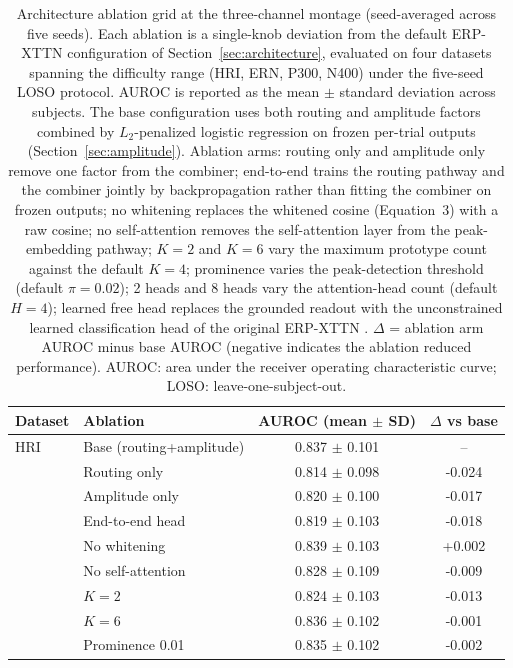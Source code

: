 \begin{table}[t]
\centering
\setlength{\tabcolsep}{6pt}
\caption{%
Architecture ablation grid at the three-channel montage (seed-averaged across five seeds). Each ablation is a single-knob deviation from the default ERP-XTTN configuration of Section~\ref{sec:architecture}, evaluated on four datasets spanning the difficulty range (HRI, ERN, P300, N400) under the five-seed LOSO protocol. AUROC is reported as the mean $\pm$ standard deviation across subjects. The base configuration uses both routing and amplitude factors combined by $L_2$-penalized logistic regression on frozen per-trial outputs (Section~\ref{sec:amplitude}). Ablation arms: routing only and amplitude only remove one factor from the combiner; end-to-end trains the routing pathway and the combiner jointly by backpropagation rather than fitting the combiner on frozen outputs; no whitening replaces the whitened cosine (Equation~3) with a raw cosine; no self-attention removes the self-attention layer from the peak-embedding pathway; $K = 2$ and $K = 6$ vary the maximum prototype count against the default $K = 4$; prominence varies the peak-detection threshold (default $\pi = 0.02$); 2 heads and 8 heads vary the attention-head count (default $H = 4$); learned free head replaces the grounded readout with the unconstrained learned classification head of the original ERP-XTTN \cite{wyman2026}. $\Delta$ = ablation arm AUROC minus base AUROC (negative indicates the ablation reduced performance). AUROC: area under the receiver operating characteristic curve; LOSO: leave-one-subject-out.%
}
\label{sup:tab-ablation}
\begin{tabular}{llcc}
\toprule
Dataset & Ablation & AUROC (mean $\pm$ SD) & $\Delta$ vs base \\
\midrule
HRI & Base (routing+amplitude) & 0.837 $\pm$ 0.101 & -- \\
 & Routing only & 0.814 $\pm$ 0.098 & -0.024 \\
 & Amplitude only & 0.820 $\pm$ 0.100 & -0.017 \\
 & End-to-end head & 0.819 $\pm$ 0.103 & -0.018 \\
 & No whitening & 0.839 $\pm$ 0.103 & +0.002 \\
 & No self-attention & 0.828 $\pm$ 0.109 & -0.009 \\
 & $K=2$ & 0.824 $\pm$ 0.103 & -0.013 \\
 & $K=6$ & 0.836 $\pm$ 0.102 & -0.001 \\
 & Prominence 0.01 & 0.835 $\pm$ 0.102 & -0.002 \\

\end{tabular}
\end{table}
